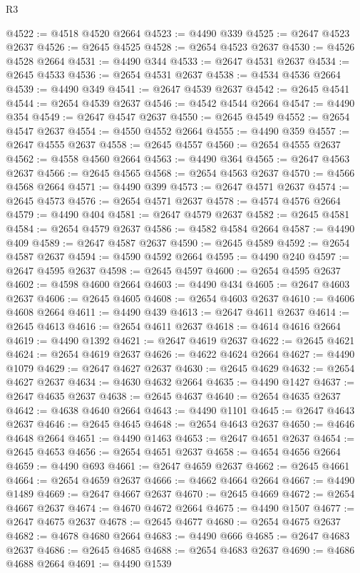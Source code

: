 \begin{lexlean}{R3}
\begin{coremodule}
@4522 := @4518 @4520 @2664
@4523 := @4490 @339
@4525 := @2647 @4523 @2637
@4526 := @2645 @4525
@4528 := @2654 @4523 @2637
@4530 := @4526 @4528 @2664
@4531 := @4490 @344
@4533 := @2647 @4531 @2637
@4534 := @2645 @4533
@4536 := @2654 @4531 @2637
@4538 := @4534 @4536 @2664
@4539 := @4490 @349
@4541 := @2647 @4539 @2637
@4542 := @2645 @4541
@4544 := @2654 @4539 @2637
@4546 := @4542 @4544 @2664
@4547 := @4490 @354
@4549 := @2647 @4547 @2637
@4550 := @2645 @4549
@4552 := @2654 @4547 @2637
@4554 := @4550 @4552 @2664
@4555 := @4490 @359
@4557 := @2647 @4555 @2637
@4558 := @2645 @4557
@4560 := @2654 @4555 @2637
@4562 := @4558 @4560 @2664
@4563 := @4490 @364
@4565 := @2647 @4563 @2637
@4566 := @2645 @4565
@4568 := @2654 @4563 @2637
@4570 := @4566 @4568 @2664
@4571 := @4490 @399
@4573 := @2647 @4571 @2637
@4574 := @2645 @4573
@4576 := @2654 @4571 @2637
@4578 := @4574 @4576 @2664
@4579 := @4490 @404
@4581 := @2647 @4579 @2637
@4582 := @2645 @4581
@4584 := @2654 @4579 @2637
@4586 := @4582 @4584 @2664
@4587 := @4490 @409
@4589 := @2647 @4587 @2637
@4590 := @2645 @4589
@4592 := @2654 @4587 @2637
@4594 := @4590 @4592 @2664
@4595 := @4490 @240
@4597 := @2647 @4595 @2637
@4598 := @2645 @4597
@4600 := @2654 @4595 @2637
@4602 := @4598 @4600 @2664
@4603 := @4490 @434
@4605 := @2647 @4603 @2637
@4606 := @2645 @4605
@4608 := @2654 @4603 @2637
@4610 := @4606 @4608 @2664
@4611 := @4490 @439
@4613 := @2647 @4611 @2637
@4614 := @2645 @4613
@4616 := @2654 @4611 @2637
@4618 := @4614 @4616 @2664
@4619 := @4490 @1392
@4621 := @2647 @4619 @2637
@4622 := @2645 @4621
@4624 := @2654 @4619 @2637
@4626 := @4622 @4624 @2664
@4627 := @4490 @1079
@4629 := @2647 @4627 @2637
@4630 := @2645 @4629
@4632 := @2654 @4627 @2637
@4634 := @4630 @4632 @2664
@4635 := @4490 @1427
@4637 := @2647 @4635 @2637
@4638 := @2645 @4637
@4640 := @2654 @4635 @2637
@4642 := @4638 @4640 @2664
@4643 := @4490 @1101
@4645 := @2647 @4643 @2637
@4646 := @2645 @4645
@4648 := @2654 @4643 @2637
@4650 := @4646 @4648 @2664
@4651 := @4490 @1463
@4653 := @2647 @4651 @2637
@4654 := @2645 @4653
@4656 := @2654 @4651 @2637
@4658 := @4654 @4656 @2664
@4659 := @4490 @693
@4661 := @2647 @4659 @2637
@4662 := @2645 @4661
@4664 := @2654 @4659 @2637
@4666 := @4662 @4664 @2664
@4667 := @4490 @1489
@4669 := @2647 @4667 @2637
@4670 := @2645 @4669
@4672 := @2654 @4667 @2637
@4674 := @4670 @4672 @2664
@4675 := @4490 @1507
@4677 := @2647 @4675 @2637
@4678 := @2645 @4677
@4680 := @2654 @4675 @2637
@4682 := @4678 @4680 @2664
@4683 := @4490 @666
@4685 := @2647 @4683 @2637
@4686 := @2645 @4685
@4688 := @2654 @4683 @2637
@4690 := @4686 @4688 @2664
@4691 := @4490 @1539

\end{coremodule}
\end{lexlean}
